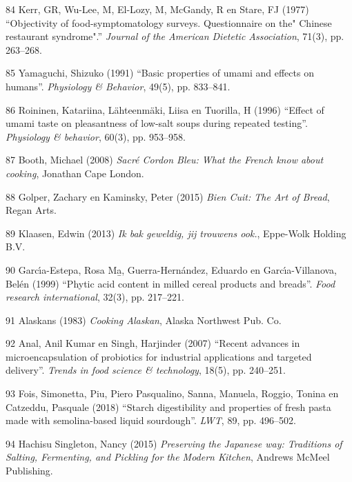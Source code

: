 \documentclass[
  11pt,
  dutch,
]{memoir}
\newlength{\cslhangindent}
\newenvironment{cslreferences}%
  {\setlength{\parindent}{0pt}%
  \everypar{\setlength{\hangindent}{\cslhangindent}}\ignorespaces}%
  {\par}
\begin{document}
\begin{cslreferences}
\leavevmode\hypertarget{ref-kerr1977objectivity}{}%
84 Kerr, GR, Wu-Lee, M, El-Lozy, M, McGandy, R en Stare, FJ (1977)
``Objectivity of food-symptomatology surveys. Questionnaire on the"
Chinese restaurant syndrome".'' \emph{Journal of the American Dietetic
Association}, 71(3), pp. 263--268.

\leavevmode\hypertarget{ref-yamaguchi1991basic}{}%
85 Yamaguchi, Shizuko (1991) ``Basic properties of umami and effects on
humans''. \emph{Physiology \& Behavior}, 49(5), pp. 833--841.

\leavevmode\hypertarget{ref-roininen1996effect}{}%
86 Roininen, Katariina, Lähteenmäki, Liisa en Tuorilla, H (1996)
``Effect of umami taste on pleasantness of low-salt soups during
repeated testing''. \emph{Physiology \& behavior}, 60(3), pp. 953--958.

\leavevmode\hypertarget{ref-cordonbleu}{}%
87 Booth, Michael (2008) \emph{Sacré Cordon Bleu: What the French know
about cooking}, Jonathan Cape London.

\leavevmode\hypertarget{ref-biencuit}{}%
88 Golper, Zachary en Kaminsky, Peter (2015) \emph{Bien Cuit: The Art of
Bread}, Regan Arts.

\leavevmode\hypertarget{ref-klaasen}{}%
89 Klaasen, Edwin (2013) \emph{Ik bak geweldig, jij trouwens ook.},
Eppe-Wolk Holding B.V.

\leavevmode\hypertarget{ref-garciux301a1999phytic}{}%
90 Garcı́a-Estepa, Rosa Ma̱, Guerra-Hernández, Eduardo en
Garcı́a-Villanova, Belén (1999) ``Phytic acid content in milled cereal
products and breads''. \emph{Food research international}, 32(3), pp.
217--221.

\leavevmode\hypertarget{ref-alaskan}{}%
91 Alaskans (1983) \emph{Cooking Alaskan}, Alaska Northwest Pub. Co.

\leavevmode\hypertarget{ref-anal2007recent}{}%
92 Anal, Anil Kumar en Singh, Harjinder (2007) ``Recent advances in
microencapsulation of probiotics for industrial applications and
targeted delivery''. \emph{Trends in food science \& technology}, 18(5),
pp. 240--251.

\leavevmode\hypertarget{ref-fois2018starch}{}%
93 Fois, Simonetta, Piu, Piero Pasqualino, Sanna, Manuela, Roggio,
Tonina en Catzeddu, Pasquale (2018) ``Starch digestibility and
properties of fresh pasta made with semolina-based liquid sourdough''.
\emph{LWT}, 89, pp. 496--502.

\leavevmode\hypertarget{ref-preservingjap}{}%
94 Hachisu Singleton, Nancy (2015) \emph{Preserving the Japanese way:
Traditions of Salting, Fermenting, and Pickling for the Modern Kitchen},
Andrews McMeel Publishing.


\end{cslreferences}
\end{document}
